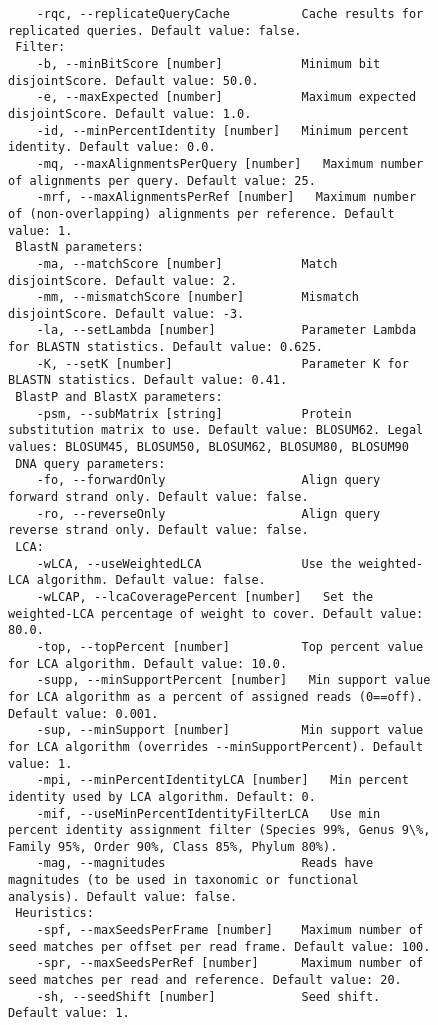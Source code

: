 \documentclass[11pt]{article}
\begin{document}
\begin{figure}[h]
{\begin{verbatim}
	-rqc, --replicateQueryCache          Cache results for replicated queries. Default value: false.
 Filter:
	-b, --minBitScore [number]           Minimum bit disjointScore. Default value: 50.0.
	-e, --maxExpected [number]           Maximum expected disjointScore. Default value: 1.0.
	-id, --minPercentIdentity [number]   Minimum percent identity. Default value: 0.0.
	-mq, --maxAlignmentsPerQuery [number]   Maximum number of alignments per query. Default value: 25.
	-mrf, --maxAlignmentsPerRef [number]   Maximum number of (non-overlapping) alignments per reference. Default value: 1.
 BlastN parameters:
	-ma, --matchScore [number]           Match disjointScore. Default value: 2.
	-mm, --mismatchScore [number]        Mismatch disjointScore. Default value: -3.
	-la, --setLambda [number]            Parameter Lambda for BLASTN statistics. Default value: 0.625.
	-K, --setK [number]                  Parameter K for BLASTN statistics. Default value: 0.41.
 BlastP and BlastX parameters:
	-psm, --subMatrix [string]           Protein substitution matrix to use. Default value: BLOSUM62. Legal values: BLOSUM45, BLOSUM50, BLOSUM62, BLOSUM80, BLOSUM90
 DNA query parameters:
	-fo, --forwardOnly                   Align query forward strand only. Default value: false.
	-ro, --reverseOnly                   Align query reverse strand only. Default value: false.
 LCA:
	-wLCA, --useWeightedLCA              Use the weighted-LCA algorithm. Default value: false.
	-wLCAP, --lcaCoveragePercent [number]   Set the weighted-LCA percentage of weight to cover. Default value: 80.0.
	-top, --topPercent [number]          Top percent value for LCA algorithm. Default value: 10.0.
	-supp, --minSupportPercent [number]   Min support value for LCA algorithm as a percent of assigned reads (0==off). Default value: 0.001.
	-sup, --minSupport [number]          Min support value for LCA algorithm (overrides --minSupportPercent). Default value: 1.
	-mpi, --minPercentIdentityLCA [number]   Min percent identity used by LCA algorithm. Default: 0.
	-mif, --useMinPercentIdentityFilterLCA   Use min percent identity assignment filter (Species 99%, Genus 9\%, Family 95%, Order 90%, Class 85%, Phylum 80%).
	-mag, --magnitudes                   Reads have magnitudes (to be used in taxonomic or functional analysis). Default value: false.
 Heuristics:
	-spf, --maxSeedsPerFrame [number]    Maximum number of seed matches per offset per read frame. Default value: 100.
	-spr, --maxSeedsPerRef [number]      Maximum number of seed matches per read and reference. Default value: 20.
	-sh, --seedShift [number]            Seed shift. Default value: 1.

\end{verbatim}}
\end{figure}
\end{document}

